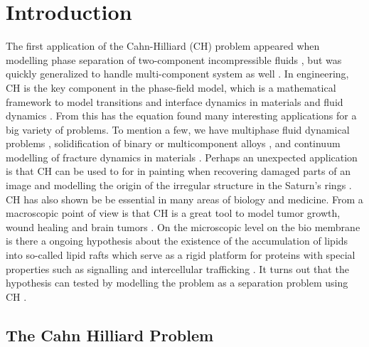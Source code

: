 \section{Introduction}\label{sec:introduction}


The first application of the Cahn-Hilliard (CH) problem appeared when modelling phase separation of two-component incompressible fluids \cite{cahn1958free, cahn1959free, cahn1961spinodal}, but was quickly generalized to handle multi-component system
as well \cite{bosch2015fractional, eyre1993systems, toth2016phase, miranville2017cahn}. In engineering, CH is the key component in
the phase-field model, which is a mathematical framework to model transitions and interface dynamics in materials and fluid dynamics \cite{steinbach2009phase, chen2002phase}.
From this has the equation found many interesting applications for a big variety of problems. To mention a few, we have
multiphase fluid dynamical problems \cite{badalassi2003computation, li2016lattice, kim2012phase, shen2010phase}, solidification of binary or multicomponent alloys \cite{kim1999phase, echebarria2004quantitative}, and continuum modelling of fracture dynamics in
materials \cite{kuhn2010continuum, li2015phase}. Perhaps an unexpected application is that CH can be used to for in painting when recovering damaged parts of an image \cite{bertozzi2006inpainting, burger2009cahn, bosch2015fractional, brkic2020image}
and modelling the origin of the irregular structure in the Saturn's rings \cite{tremaine2003origin}.
CH has also shown be be essential in many areas of biology and medicine. From a macroscopic point of view is that CH is a great tool to model tumor growth, wound healing and brain tumors \cite{agosti2017cahn, cristini2009nonlinear}.
On the microscopic level on the bio membrane is there a ongoing hypothesis about the existence of the accumulation of lipids into so-called lipid rafts which serve as a rigid platform for proteins with
special properties such as signalling and intercellular trafficking \cite{ levental2020lipid, hancock2006lipid, munro2003lipid, simons1997functional}. It turns out that the hypothesis can tested by modelling the problem as a separation problem using
CH \cite{miller2020divide, garcke2016coupled, yushutin2019computational}.

\subsection{The Cahn Hilliard Problem}%
\label{sub:the_equations}

